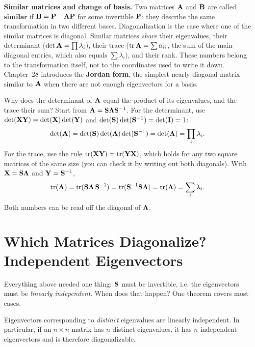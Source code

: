 \begin{connectionbox}
\textbf{Similar matrices and change of basis.} Two matrices
$\mathbf{A}$ and $\mathbf{B}$ are called \textbf{similar} if $\mathbf{B} =
\mathbf{P}^{-1}\mathbf{A}\mathbf{P}$ for some invertible $\mathbf{P}$: they describe the
same transformation in two different bases. Diagonalization is the case
where one of the similar matrices is diagonal. Similar matrices
\emph{share} their eigenvalues, their determinant ($\det\mathbf{A} = \prod\lambda_i$),
their trace ($\operatorname{tr}\mathbf{A} = \sum a_{ii}$, the sum of the main-diagonal entries,
which also equals $\sum\lambda_i$), and their rank. These numbers belong to the
transformation itself, not to the coordinates used to write it down.
Chapter~28 introduces the \textbf{Jordan form}, the simplest nearly diagonal
matrix similar to $\mathbf{A}$ when there are not enough eigenvectors for a basis.
\end{connectionbox}

\begin{walkbox}
Why does the determinant of $\mathbf{A}$ equal the product of its eigenvalues,
and the trace their sum? Start from $\mathbf{A} = \mathbf{S}\mathbf{\Lambda}\mathbf{S}^{-1}$.
For the determinant, use $\det(\mathbf{X}\mathbf{Y}) = \det(\mathbf{X})\det(\mathbf{Y})$ and
$\det(\mathbf{S})\det(\mathbf{S}^{-1}) = \det(\mathbf{I}) = 1$:
\[
  \det(\mathbf{A}) = \det(\mathbf{S})\det(\mathbf{\Lambda})\det(\mathbf{S}^{-1})
  = \det(\mathbf{\Lambda}) = \prod_i\lambda_i .
\]
For the trace, use the rule $\operatorname{tr}(\mathbf{X}\mathbf{Y}) = \operatorname{tr}(\mathbf{Y}\mathbf{X})$, which
holds for any two square matrices of the same size (you can check it by writing
out both diagonals). With $\mathbf{X} = \mathbf{S}\mathbf{\Lambda}$ and
$\mathbf{Y} = \mathbf{S}^{-1}$,
\[
  \operatorname{tr}(\mathbf{A}) = \operatorname{tr}(\mathbf{S}\mathbf{\Lambda}\,\mathbf{S}^{-1})
  = \operatorname{tr}(\mathbf{S}^{-1}\mathbf{S}\mathbf{\Lambda}) = \operatorname{tr}(\mathbf{\Lambda}) = \sum_i\lambda_i .
\]
Both numbers can be read off the diagonal of $\mathbf{\Lambda}$.
\end{walkbox}

\section{Which Matrices Diagonalize? Independent Eigenvectors}
\label{ch24:which}

Everything above needed one thing: $\mathbf{S}$ must be invertible, i.e. the
eigenvectors must be \emph{linearly independent}. When does that happen? One
theorem covers most cases.

\begin{theorem}
\label{ch24:thm-distinct}
Eigenvectors corresponding to \emph{distinct} eigenvalues are linearly
independent. In particular, if an $n\times n$ matrix has $n$ distinct
eigenvalues, it has $n$ independent eigenvectors and is therefore
diagonalizable.
\end{theorem}

